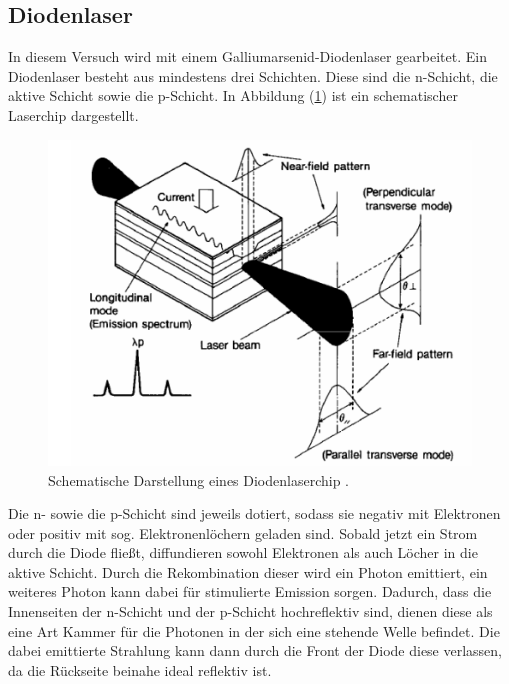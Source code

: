 \subsection{Diodenlaser}
In diesem Versuch wird mit einem Galliumarsenid-Diodenlaser gearbeitet. Ein Diodenlaser besteht aus mindestens drei Schichten. Diese sind die n-Schicht, die aktive Schicht sowie die p-Schicht.
In Abbildung (\ref{fig:diod}) ist ein schematischer Laserchip dargestellt.
\begin{figure}[h!]
  \centering
  \includegraphics[scale=0.7]{fig/diod.png}
  \caption{Schematische Darstellung eines Diodenlaserchip \cite[3]{Anleitung}.}
  \label{fig:diod}
\end{figure}
\FloatBarrier
\noindent Die n- sowie die p-Schicht sind jeweils dotiert, sodass sie negativ mit Elektronen oder positiv mit sog. Elektronenlöchern geladen sind. Sobald jetzt ein Strom durch die Diode fließt, diffundieren sowohl Elektronen als auch Löcher in die aktive Schicht. Durch die Rekombination dieser wird ein Photon emittiert, ein weiteres Photon kann dabei für stimulierte Emission sorgen.
Dadurch, dass die Innenseiten der n-Schicht und der p-Schicht hochreflektiv sind, dienen diese als eine Art Kammer für die Photonen in der sich eine stehende Welle befindet.
Die dabei emittierte Strahlung kann dann durch die Front der Diode diese verlassen, da die Rückseite beinahe ideal reflektiv ist.\\

